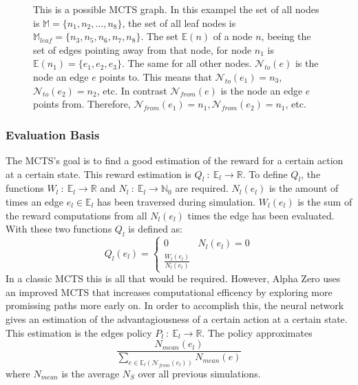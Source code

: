 \documentclass[12pt]{article}
\begin{document}
\begin{figure}[H]
  \centering
  
  \captionsetup{width=.9\linewidth}
  \caption{This is a possible MCTS graph. In this exampel the set of all nodes is \(\mathbb M = \{n_1, n_2,\hdots,n_8\}\), the set of all leaf nodes is \(\mathbb M_{leaf} =  \{n_3, n_5, n_6, n_7, n_8\}\). The set  \(\mathbb E(n)\) of a node \(n\), beeing the set of edges pointing away from that node, for node \(n_1\) is \(\mathbb E(n_1) = \{e_1, e_2,e_3\}\). The same for all other nodes. \(\mathcal N_{to}(e)\) is the node an edge \(e\) points to. This means that \(\mathcal N_{to}(e_1) = n_3\), \(\mathcal N_{to}(e_2) = n_2\), etc. In contrast \(\mathcal N_{from}(e)\) is the node an edge \(e\) points from. Therefore, \(\mathcal N_{from}(e_1) = n_1, \mathcal N_{from}(e_2) = n_1\), etc.}
	\label{fig:mcts:example}
\end{figure}

\subsubsection{Evaluation Basis}
The MCTS's goal is to find a good estimation of the reward for a certain action at a certain state. This reward estimation is \(Q_l~:~\mathbb{E}_{l}\to \mathbb{R}\). To define \(Q_l\), the functions \(W_l~:~\mathbb{E}_{l}\to\mathbb{R}\) and \(N_l~:~\mathbb{E}_{l}\to\mathbb{N}_0\) are required. \(N_l(e_l)\) is the amount of times an edge \(e_l\in\mathbb{E}_{l}\) has been traversed during simulation. \(W_l(e_l)\) is the sum of the reward computations from all \(N_l(e_l)\) times the edge has been evaluated. With these two functions \(Q_l\) is defined as:
\begin{equation}\label{eq:Ql}
Q_l(e_l) = 
\begin{cases}
0 & N_l(e_l) = 0\\
\frac{W_l(e_l)}{N_l(e_l)} &
\end{cases}
\end{equation}
In a classic MCTS this is all that would be required. However, Alpha Zero uses an improved MCTS that increases computational efficency by exploring more promissing paths more early on. In order to accomplish this, the neural network gives an estimation of the advantagiousness of a certain action at a certain state. This estimation is the edges policy \(P_l~:~\mathbb E_l \to \mathbb R\). The policy approximates
\begin{equation}
\frac{N_{mean}(e_l)}{\sum_{e\in\mathbb E_l(\mathcal N_{from}(e_l))} N_{mean}(e)}
\end{equation}
where \(N_{mean}\) is the average \(N_S\) over all previous simulations.
\end{document}
